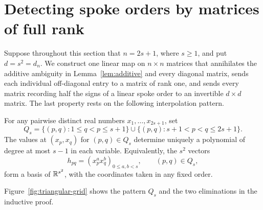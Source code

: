 \section{Detecting spoke orders by matrices of full rank}
\label{sec:detector}

Suppose throughout this section that $n=2s+1$, where $s\geq1$, and put
$d=s^2=d_n$.  We construct one linear map on $n\times n$ matrices that
annihilates the additive ambiguity in Lemma~\ref{lem:additive} and every
diagonal matrix, sends
each individual off-diagonal entry to a matrix of rank one, and sends
every matrix recording half the signs of a linear spoke order to an
invertible $d\times d$ matrix.
The last property rests on the following interpolation pattern.

\begin{lemma}
\label{lem:triangular-basis}
For any pairwise distinct real numbers $x_1,\ldots,x_{2s+1}$, set
\begin{equation}
\label{eq:triangular-pattern}
  Q_s=
  \{(p,q):1\leq q<p\leq s+1\}
  \mathbin{\cup}
  \{(p,q):s+1<p<q\leq2s+1\}.
\end{equation}
The values at $(x_p,x_q)$ for $(p,q)\in Q_s$ determine uniquely a
polynomial of degree at most $s-1$ in each variable.
Equivalently, the $s^2$ vectors
\[
  h_{pq}=(x_p^a x_q^b)_{0\leq a,b<s},\qquad (p,q)\in Q_s,
\]
form a basis of $\mathbb R^{s^2}$, with the coordinates taken in any fixed order.
\end{lemma}

Figure~\ref{fig:triangular-grid} shows the pattern $Q_s$ and the two
eliminations in the inductive proof.


